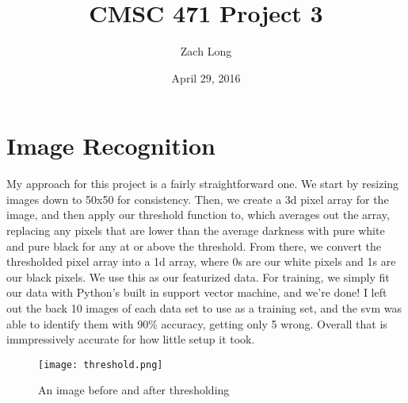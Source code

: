 \documentclass{article}
\title{CMSC 471 Project 3}
\author{Zach Long}
\date{April 29, 2016}
\begin{document}
   \maketitle
   \section{Image Recognition}
   My approach for this project is a fairly straightforward one. We start by resizing images down to 50x50 for consistency. Then, we create a 3d pixel array for the image, and then apply our threshold function to, which averages out the array, replacing any pixels that are lower than the average darkness with pure white and pure black for any at or above the threshold. From there, we convert the thresholded pixel array into a 1d array, where 0s are our white pixels and 1s are our black pixels. We use this as our featurized data. For training, we simply fit our data with Python's built in support vector machine, and we're done! I left out the back 10 images of each data set to use as a training set, and the svm was able to identify them with 90\% accuracy, getting only 5 wrong. Overall that is immpressively accurate for how little setup it took.

   \begin{figure}[h!]
      \texttt{[image: threshold.png]}
      \caption{An image before and after thresholding}
      \label{fig:graph1}
   \end{figure}
\end{document}
